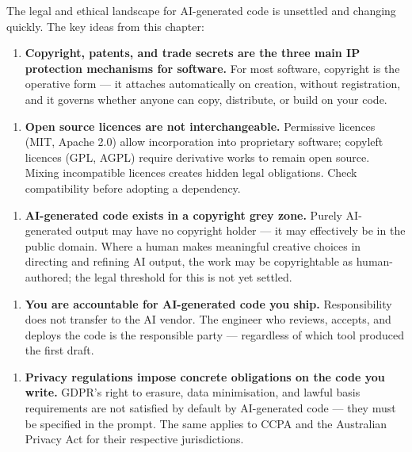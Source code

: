 \documentclass[11pt,a4paper]{book}
\begin{document}
The legal and ethical landscape for AI-generated code is unsettled and changing quickly. The key ideas from this chapter:

\begin{enumerate}
  \item \textbf{Copyright, patents, and trade secrets are the three main IP protection mechanisms for software.} For most software, copyright is the operative form --- it attaches automatically on creation, without registration, and it governs whether anyone can copy, distribute, or build on your code.
\end{enumerate}

\begin{enumerate}
  \item \textbf{Open source licences are not interchangeable.} Permissive licences (MIT, Apache 2.0) allow incorporation into proprietary software; copyleft licences (GPL, AGPL) require derivative works to remain open source. Mixing incompatible licences creates hidden legal obligations. Check compatibility before adopting a dependency.
\end{enumerate}

\begin{enumerate}
  \item \textbf{AI-generated code exists in a copyright grey zone.} Purely AI-generated output may have no copyright holder --- it may effectively be in the public domain. Where a human makes meaningful creative choices in directing and refining AI output, the work may be copyrightable as human-authored; the legal threshold for this is not yet settled.
\end{enumerate}

\begin{enumerate}
  \item \textbf{You are accountable for AI-generated code you ship.} Responsibility does not transfer to the AI vendor. The engineer who reviews, accepts, and deploys the code is the responsible party --- regardless of which tool produced the first draft.
\end{enumerate}

\begin{enumerate}
  \item \textbf{Privacy regulations impose concrete obligations on the code you write.} GDPR's right to erasure, data minimisation, and lawful basis requirements are not satisfied by default by AI-generated code --- they must be specified in the prompt. The same applies to CCPA and the Australian Privacy Act for their respective jurisdictions.
\end{enumerate}
\end{document}
